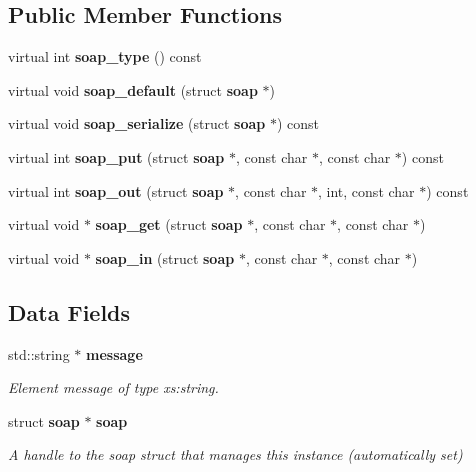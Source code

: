 \subsection*{Public Member Functions}
\begin{DoxyCompactItemize}
\item 
virtual int {\bfseries soap\_\-type} () const \label{classtransfer____TransferException_ada3774e051f2702ea4ef9434a411ac3a}

\item 
virtual void {\bfseries soap\_\-default} (struct {\bf soap} $\ast$)\label{classtransfer____TransferException_afdd7f3fc6f29d1dff82ae4e0106a70b3}

\item 
virtual void {\bfseries soap\_\-serialize} (struct {\bf soap} $\ast$) const \label{classtransfer____TransferException_a5e2fe20a5322406aa67613a34df3d465}

\item 
virtual int {\bfseries soap\_\-put} (struct {\bf soap} $\ast$, const char $\ast$, const char $\ast$) const \label{classtransfer____TransferException_a238c3881c3d2d21f720251015dd215a2}

\item 
virtual int {\bfseries soap\_\-out} (struct {\bf soap} $\ast$, const char $\ast$, int, const char $\ast$) const \label{classtransfer____TransferException_a90076fe6913f429688bdab161422e464}

\item 
virtual void $\ast$ {\bfseries soap\_\-get} (struct {\bf soap} $\ast$, const char $\ast$, const char $\ast$)\label{classtransfer____TransferException_a39a79a991cccec1ebd6b07d58aaf5dc4}

\item 
virtual void $\ast$ {\bfseries soap\_\-in} (struct {\bf soap} $\ast$, const char $\ast$, const char $\ast$)\label{classtransfer____TransferException_a9e5d42911f2b8455de991d16ba4294fe}

\end{DoxyCompactItemize}
\subsection*{Data Fields}
\begin{DoxyCompactItemize}
\item 
std::string $\ast$ {\bf message}
\begin{DoxyCompactList}\small\item\em Element message of type xs:string. \item\end{DoxyCompactList}\item 
struct {\bf soap} $\ast$ {\bf soap}\label{classtransfer____TransferException_adcfb27ab8b2b611134e14c45825c89d2}

\begin{DoxyCompactList}\small\item\em A handle to the soap struct that manages this instance (automatically set) \item\end{DoxyCompactList}\end{DoxyCompactItemize}


